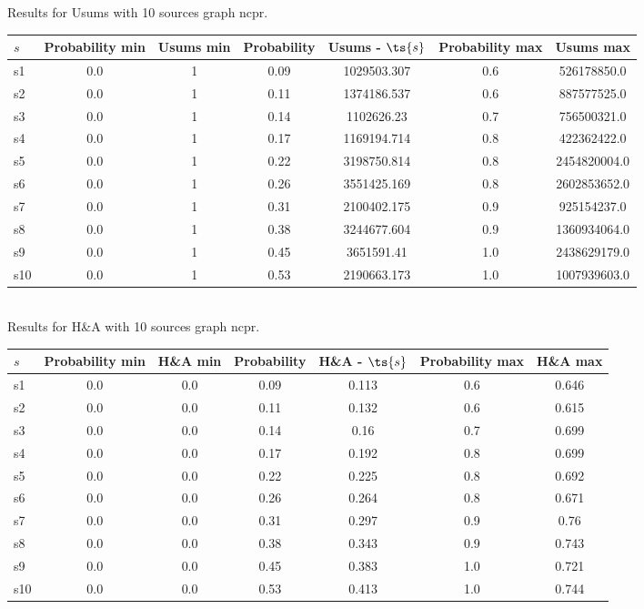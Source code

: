 \documentclass{article}
\begin{document}
\noindent Results for Usums with 10 sources graph ncpr.

\noindent\begin{tabular}{|l|c|c|c|c|c|c|}
\hline
$s$& Probability min & Usums min & Probability & Usums - $\ts{s}$ & Probability max & Usums max\\
\hline
s1 &0.0 & 1 & 0.09 & 1029503.307 & 0.6 & 526178850.0\\
\hline
s2 &0.0 & 1 & 0.11 & 1374186.537 & 0.6 & 887577525.0\\
\hline
s3 &0.0 & 1 & 0.14 & 1102626.23 & 0.7 & 756500321.0\\
\hline
s4 &0.0 & 1 & 0.17 & 1169194.714 & 0.8 & 422362422.0\\
\hline
s5 &0.0 & 1 & 0.22 & 3198750.814 & 0.8 & 2454820004.0\\
\hline
s6 &0.0 & 1 & 0.26 & 3551425.169 & 0.8 & 2602853652.0\\
\hline
s7 &0.0 & 1 & 0.31 & 2100402.175 & 0.9 & 925154237.0\\
\hline
s8 &0.0 & 1 & 0.38 & 3244677.604 & 0.9 & 1360934064.0\\
\hline
s9 &0.0 & 1 & 0.45 & 3651591.41 & 1.0 & 2438629179.0\\
\hline
s10 &0.0 & 1 & 0.53 & 2190663.173 & 1.0 & 1007939603.0\\
\hline
\end{tabular}\\

\noindent Results for H\&A with 10 sources graph ncpr.

\noindent\begin{tabular}{|l|c|c|c|c|c|c|}
\hline
$s$& Probability min & H\&A min & Probability & H\&A - $\ts{s}$ & Probability max & H\&A max\\
\hline
s1 &0.0 & 0.0 & 0.09 & 0.113 & 0.6 & 0.646\\
\hline
s2 &0.0 & 0.0 & 0.11 & 0.132 & 0.6 & 0.615\\
\hline
s3 &0.0 & 0.0 & 0.14 & 0.16 & 0.7 & 0.699\\
\hline
s4 &0.0 & 0.0 & 0.17 & 0.192 & 0.8 & 0.699\\
\hline
s5 &0.0 & 0.0 & 0.22 & 0.225 & 0.8 & 0.692\\
\hline
s6 &0.0 & 0.0 & 0.26 & 0.264 & 0.8 & 0.671\\
\hline
s7 &0.0 & 0.0 & 0.31 & 0.297 & 0.9 & 0.76\\
\hline
s8 &0.0 & 0.0 & 0.38 & 0.343 & 0.9 & 0.743\\
\hline
s9 &0.0 & 0.0 & 0.45 & 0.383 & 1.0 & 0.721\\
\hline
s10 &0.0 & 0.0 & 0.53 & 0.413 & 1.0 & 0.744\\
\hline
\end{tabular}\\
\end{document}
